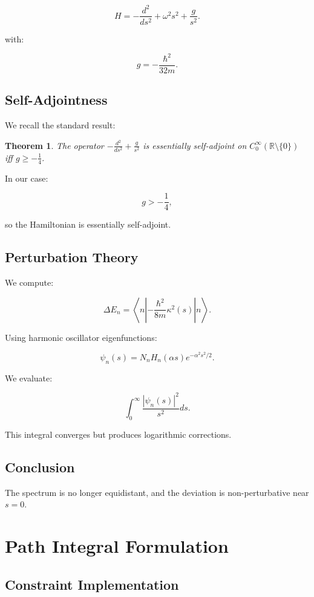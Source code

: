 \documentclass[11pt]{article}
\newtheorem{theorem}{Theorem}[section]
\begin{document}
\[
H = -\frac{d^2}{ds^2} + \omega^2 s^2 + \frac{g}{s^2}.
\]

with:

\[
g = -\frac{\hbar^2}{32m}.
\]

\subsection{Self-Adjointness}

We recall the standard result:

\begin{theorem}
The operator $-\frac{d^2}{ds^2} + \frac{g}{s^2}$ is essentially self-adjoint on $C_0^\infty(\mathbb{R}\setminus\{0\})$ iff $g \geq -\frac{1}{4}$.
\end{theorem}

In our case:

\[
g > -\frac{1}{4},
\]

so the Hamiltonian is essentially self-adjoint.

\subsection{Perturbation Theory}

We compute:

\[
\Delta E_n =
\left\langle n \left|
-\frac{\hbar^2}{8m}\kappa^2(s)
\right| n \right\rangle.
\]

Using harmonic oscillator eigenfunctions:

\[
\psi_n(s) = N_n H_n(\alpha s)e^{-\alpha^2 s^2/2}.
\]

We evaluate:

\[
\int_0^\infty \frac{|\psi_n(s)|^2}{s^2} ds.
\]

This integral converges but produces logarithmic corrections.

\subsection{Conclusion}

The spectrum is no longer equidistant, and the deviation is non-perturbative near $s=0$.


\section{Path Integral Formulation}

\subsection{Constraint Implementation}
\end{document}

